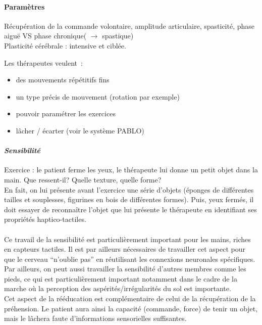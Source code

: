 	\paragraph{Paramètres\\}
Récupération de la commande volontaire, amplitude articulaire, spasticité, phase aiguë VS phase chronique( $ \rightarrow $ spastique)\\
Plasticité cérébrale : intensive et ciblée. \newline

Les thérapeutes veulent~: 
\begin{itemize}
	\item des mouvements répétitifs fins
	\item un type précis de mouvement (rotation par exemple)
	\item pouvoir paramétrer les exercices
	\item lâcher / écarter (voir le système PABLO)
\end{itemize}

	\paragraph{\emph{Sensibilité} \\ \quad}
Exercice : le patient ferme les yeux, le thérapeute lui donne un petit objet dans la main. Que ressent-il? Quelle texture, quelle forme? \\
En fait, on lui présente avant l’exercice une série d’objets (éponges de différentes tailles et souplesses, figurines en bois de différentes formes). Puis, yeux fermés, il doit essayer de reconnaître l’objet que lui présente le thérapeute en identifiant ses propriétés haptico-tactiles.
\paragraph{} 
Ce travail de la sensibilité est particulièrement important pour les mains, riches en capteurs tactiles. Il est par ailleurs nécessaires de travailler cet aspect pour que le cerveau “n’oublie pas” en réutilisant les connexions neuronales spécifiques. Par ailleurs, on peut aussi travailler la sensibilité d’autres membres comme les pieds, ce qui est particulièrement important notamment dans le cadre de la marche où la perception des aspérités/irrégularités du sol est importante.\\
Cet aspect de la rééducation est complémentaire de celui de la récupération de la préhension. Le patient aura ainsi la capacité (commande, force) de tenir un objet, mais le lâchera faute d’informations sensorielles suffisantes.


